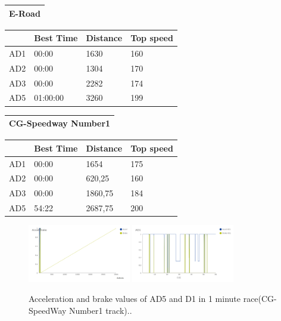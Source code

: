 \documentclass{llncs}
\begin{document}
\begin{table} [h!]
\begin{tabular}{ ||p{3cm}||p{3cm}||p{3cm}||p{3 cm}||}
	\end{tabular}
	\begin{tabular}{ |p{}|}
		\hline
		\textbf{E-Road}   
		\\
		\hline
	\end{tabular}
	\begin{tabular}{ ||p{3cm}||p{3cm}||p{3cm}||p{3 cm}||}
		\hline
		{ \color{blue}\textbf{} }&
		{ \color{red}\textbf{Best Time} }&
		{ \color{red} \textbf{Distance } } &
		{ \color{red} \textbf{Top speed} }
		\\
		\hline
		AD1 & 00:00 &1630 &  160
		\\
		\hline
		AD2 & 00:00 & 1304 & 170 
		\\
		\hline
		AD3 & 00:00  &2282& 174
		\\
		\hline 
		AD5 & 01:00:00 & 3260 & 199
		\\
		\hline 
		
	\end{tabular}
	\begin{tabular}{ |p{}|}
		\hline
		\textbf{CG-Speedway Number1}   
		\\
		\hline
	\end{tabular}
	\begin{tabular}{ ||p{3cm}||p{3cm}||p{3cm}||p{3 cm}||}
		\hline
		{ \color{blue}\textbf{} }&
		{ \color{red}\textbf{Best Time} }&
		{ \color{red} \textbf{Distance } } &
		{ \color{red} \textbf{Top speed} }
		\\
		\hline
		AD1 & 00:00 & 1654&  175
		\\
		\hline
		AD2 & 00:00  & 620,25& 160 
		\\
		\hline
		AD3 & 00:00  &1860,75&184 
		\\
		\hline 
		AD5 & 54:22& 2687,75 &200
		\\
		\hline 
		
	\end{tabular}
\end{table}
\newpage
\begin{figure}[h!]
	
	\centering
	\includegraphics[width=0.4\textwidth]{fig/AD5Accel.png}
	\includegraphics[width=0.4\textwidth]{fig/AD1accel.png}
	\begin{minipage}{10cm}
		\centering
		\caption{\footnotesize Acceleration and brake values of AD5 and D1 in 1 minute race(CG-SpeedWay Number1 track)..}
		\label{accel/brake}
	\end{minipage} 
	
\end{figure}
\end{document}
